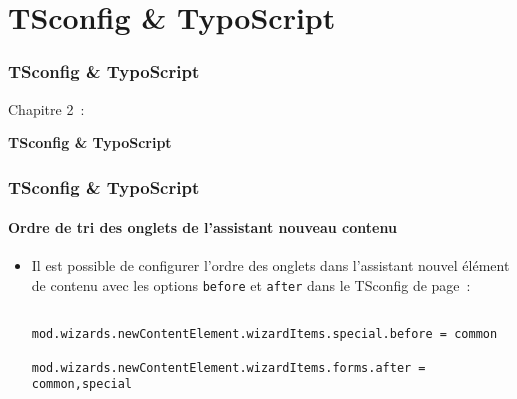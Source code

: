 %

\section{TSconfig \& TypoScript}
\begin{frame}[fragile]
	\frametitle{TSconfig \& TypoScript}

	\begin{center}\huge{Chapitre 2~:}\end{center}
	\begin{center}\huge{\color{typo3darkgrey}\textbf{TSconfig \& TypoScript}}\end{center}

\end{frame}

\begin{frame}[fragile]
	\frametitle{TSconfig \& TypoScript}
	\framesubtitle{Ordre de tri des onglets de l'assistant nouveau contenu}

	\lstset{basicstyle=\tiny\ttfamily}

	\begin{itemize}
		\item Il est possible de configurer l'ordre des onglets dans l'assistant nouvel
			élément de contenu avec les options \texttt{before} et \texttt{after} dans
			le TSconfig de page~:

			\begin{lstlisting}
				mod.wizards.newContentElement.wizardItems.special.before = common
				mod.wizards.newContentElement.wizardItems.forms.after = common,special
			\end{lstlisting}

	\end{itemize}

\end{frame}

